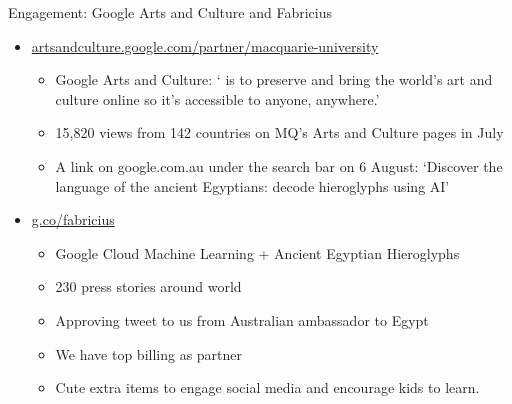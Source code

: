 \documentclass[aspectratio=169, 11pt]{beamer} %
\begin{document}
{%
\begin{frame}{Engagement: Google Arts and Culture and Fabricius}

\begin{itemize}
    \item \url{artsandculture.google.com/partner/macquarie-university}
    \begin{itemize}
    \item Google Arts and Culture: ` is to preserve and bring the world’s art and culture online so it’s accessible to anyone, anywhere.' \parencite{Google_Arts_and_Culture2020-ga}
    \item 15,820 views from 142 countries on MQ's Arts and Culture pages in July
    \item A link on google.com.au under the search bar on 6 August: `Discover the language of the ancient Egyptians: decode hieroglyphs using AI'
    \end{itemize}
    \item \url{g.co/fabricius}
    \begin{itemize}
    \item Google Cloud Machine Learning + Ancient Egyptian Hieroglyphs
    \item 230 press stories around world
    \item Approving tweet to us from Australian ambassador to Egypt
    \item We have top billing as partner
    \item Cute extra items to engage social media and encourage kids to learn.
    \end{itemize}
\end{itemize}

\end{frame}}
\end{document}
